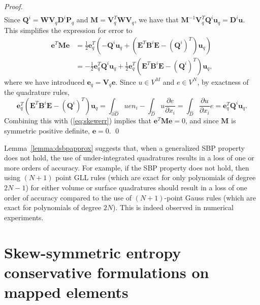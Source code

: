 \documentclass{svjour3}                     %
\renewcommand{\hat}{\widehat}
\newcommand{\pd}[2]{\frac{\partial#1}{\partial#2}}
\newcommand{\LRp}[1]{\left( #1 \right)}
\begin{document}
\begin{proof}
{\begin{align*}
\end{align*}}
Since $\bm{Q}^i = \bm{W}\bm{V}_q\bm{D}^i\bm{P}_q$ and $\bm{M} = \bm{V}_q^T\bm{W}\bm{V}_q$, we have that $\bm{M}^{-1}\bm{V}_q^T\bm{Q}^i\bm{u}_q = \bm{D}^i\bm{u}$.  This simplifies the expression for error to
\begin{align}
\bm{e}^T\bm{M}\bm{e} &= \frac{1}{2}
\bm{e}_q^T\LRp{-\bm{Q}^i\bm{u}_q + \LRp{\bm{E}^T\bm{B}^i\bm{E} - \LRp{\bm{Q}^i}^T}\bm{u}_q} \label{eq:skewerr}\\
&= -\frac{1}{2}
\bm{e}_q^T\bm{Q}^i\bm{u}_q + \frac{1}{2}\bm{e}_q^T\LRp{\bm{E}^T\bm{B}^i\bm{E} - \LRp{\bm{Q}^i}^T}\bm{u}_q, \nonumber
\end{align}
where we have introduced $\bm{e}_q = \bm{V}_q\bm{e}$.  %
Since $u \in V^M$ and $e \in V^N$, by exactness of the quadrature rules, 
\[
\bm{e}_q^T\LRp{\bm{E}^T\bm{B}^i\bm{E} - \LRp{\bm{Q}^i}^T}\bm{u}_q = \int_{\partial \hat{D}} u e n_i - \int_{\hat{D}} u \pd{e}{x_i}
= \int_{\hat{D}} \pd{u}{x_i} e = \bm{e}_q^T\bm{Q}^i\bm{u}_q.
\]
Combining this with (\ref{eq:skewerr}) implies that $\bm{e}^T\bm{M}\bm{e} = 0$, and since $\bm{M}$ is symmetric positive definite, $\bm{e} = 0$.  
\qed\end{proof}


Lemma~\ref{lemma:dsbpapprox} suggests that, when a generalized SBP property does not hold, the use of under-integrated quadratures results in a loss of one or more orders of accuracy.  For example, if the SBP property does not hold, then using $(N+1)$ point GLL rules (which are exact for only polynomials of degree $2N-1$) for either volume or surface quadratures should result in a loss of one order of accuracy compared to the use of $(N+1)$-point Gauss rules (which are exact for polynomials of degree $2N$).  This is indeed observed in numerical experiments.  



\section{Skew-symmetric entropy conservative formulations on mapped elements}
\label{sec:skew2}
\end{document}
